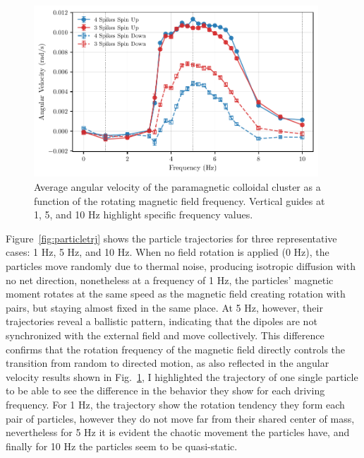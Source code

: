 \begin{figure}[h]
\begin{center}
\includegraphics[width=0.95\textwidth]{figures/AvsF.pdf}
\end{center}
\caption[Angular velocity as a function of driving frequency.]
{Average angular velocity of the paramagnetic colloidal cluster as a function of the rotating magnetic field frequency. Vertical guides at 1, 5, and 10 Hz highlight specific frequency values.}
\label{fig:angularvsfrequency}
\end{figure}


Figure~\ref{fig:particletrj} shows the particle trajectories for three representative cases: 1 Hz, 5 Hz, and 10 Hz. When no field rotation is applied (0 Hz), the particles move randomly due to thermal noise, producing isotropic diffusion with no net direction, nonetheless at a frequency of 1 Hz, the particles' magnetic moment rotates at the same speed as the magnetic field creating rotation with pairs, but staying almost fixed in the same place. At 5 Hz, however, their trajectories reveal a ballistic pattern, indicating that the dipoles are not synchronized with the external field and move collectively. This difference confirms that the rotation frequency of the magnetic field directly controls the transition from random to directed motion, as also reflected in the angular velocity results shown in Fig.~\ref{fig:angularvsfrequency}, I highlighted the trajectory of one single particle to be able to see the difference in the behavior they show for each driving frequency. For 1 Hz, the trajectory show the rotation tendency they form each pair of particles, however they do not move far from their shared center of mass, nevertheless for 5 Hz it is evident the chaotic movement the particles have, and finally for 10 Hz the particles seem to be quasi-static.


